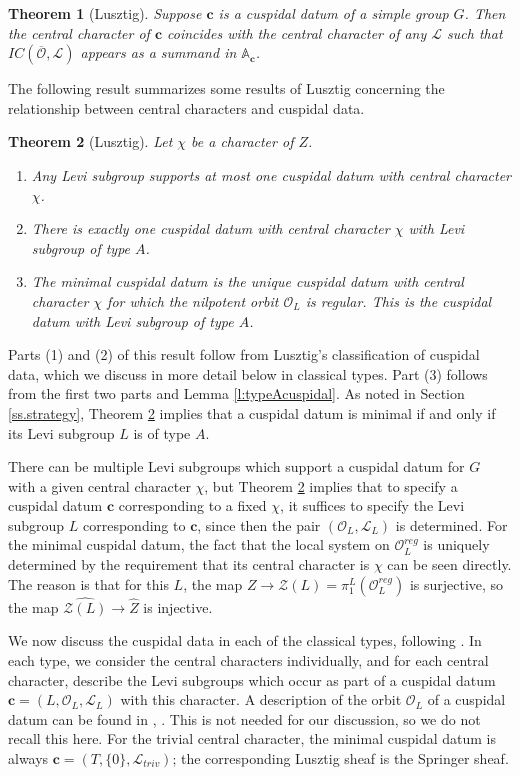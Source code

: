 \documentclass[reqno,11pt]{amsart}
\newtheorem{Thm}{Theorem}[section]
\theoremstyle{remark}
\theoremstyle{remark}
\theoremstyle{definition}
\theoremstyle{definition}
\theoremstyle{definition}
\numberwithin{equation}{section}
\newcommand{\cl}{\mathcal{L}}
\newcommand{\co}{\mathcal{O}}
\newcommand{\cz}{\mathcal{Z}}
\newcommand{\vc}{\mathbf{c}}
\renewcommand{\hat}{\widehat}
\begin{document}
\begin{Thm}[Lusztig]\label{lu_thm_central}
Suppose $\mathbf{c}$ is a cuspidal datum of a simple group $G$.  Then
the central character of $\vc$ coincides
with the central character of any $\cl$ such that $IC(\overline{\co}, \cl)$
appears as a summand in $\mathbb A_\textbf{c}$.
\end{Thm}

The following result summarizes some results of Lusztig concerning the relationship between central
characters and cuspidal data.

\begin{Thm}[Lusztig]\label{lu_summary}
Let $\chi$ be a character of $Z$.
\begin{enumerate}
\item Any Levi subgroup supports at most one cuspidal datum with central character $\chi$.  
\item There is exactly one cuspidal datum with 
central character $\chi$ with Levi subgroup
of type $A$.
\item The minimal cuspidal datum is the unique cuspidal
datum with central character $\chi$ for which the nilpotent orbit $\co_L$ is regular.
This is the cuspidal datum with Levi subgroup of type $A$.
\end{enumerate}
\end{Thm}

Parts (1) and (2) of this result follow from Lusztig's classification of cuspidal data, which we discuss
in more detail below in classical types.  Part (3) follows from the first two parts and Lemma \ref{l:typeAcuspidal}.
As noted in Section \ref{ss.strategy}, Theorem \ref{lu_summary} implies that a cuspidal
datum is minimal if and only if its Levi subgroup $L$ is of type $A$.

There 
can be multiple Levi subgroups which support
a cuspidal datum for $G$ with a given central character $\chi$, but Theorem \ref{lu_summary}
implies that to specify a cuspidal datum $\vc$ corresponding to a fixed $\chi$,
it suffices to specify the Levi subgroup $L$ corresponding to $\vc$, since then the pair $(\co_L, \cl_L)$
is determined.  For the minimal cuspidal datum, the fact that the local system on 
$\co_L^{reg}$ is uniquely
determined by the requirement that its central character is $\chi$ can be seen directly.  The reason is
that for this $L$, the map $Z \to \cz(L) = \pi_1^L(\co_L^{reg})$ is surjective,
so the map $\hat{\cz(L)} \to \hat{Z}$ is injective.  


We now discuss the cuspidal data in each of the classical types,
following \cite{Lu84, LuSpal85}.  In each type, we consider the central characters individually, and for
each central character, describe the Levi subgroups which occur as part of a cuspidal datum $\vc =  (L, \co_L, \cl_L)$ with this character.
A description of the orbit $\co_L$ of a cuspidal datum can be found in \cite{Lu84}, \cite{LuSpal85}.
This is not needed for our discussion, so we do not recall this here.
For the trivial central character, the minimal cuspidal datum is always $\vc = (T, \{0 \}, \cl_{triv})$; the corresponding Lusztig sheaf is the Springer sheaf.
\end{document}
